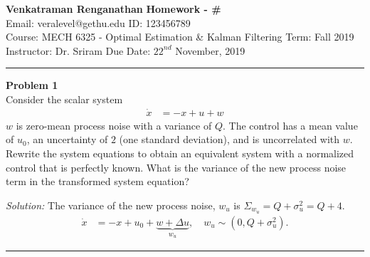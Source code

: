 \documentclass[a4paper, 11pt]{article}
\newenvironment{problem}[2][Problem]
    { \begin{mdframed}[backgroundcolor=gray!20] \textbf{#1 #2} \\}
    {  \end{mdframed}}
\newenvironment{solution}
    {\textit{Solution:}}
    {}
\begin{document}
\noindent
\large\textbf{Venkatraman Renganathan} \hfill \textbf{Homework - \#}   \\
Email: veralevel@gethu.edu \hfill ID: 123456789 \\
\normalsize Course: MECH 6325 - Optimal Estimation \& Kalman Filtering \hfill Term: Fall 2019\\
Instructor: Dr. Sriram \hfill Due Date: $22^{nd}$ November, 2019 \\
\noindent\rule{7in}{2.8pt}
\begin{problem}{1}
Consider the scalar system
\begin{align*}
    \Dot{x} &= -x + u + w
\end{align*}
$w$ is zero-mean process noise with a variance of $Q$. The control has a mean value of $u_0$, an uncertainty of $2$ (one standard deviation), and is uncorrelated with $w$. Rewrite the system equations to obtain an equivalent system with a normalized control that is perfectly known. What is the variance of the new process noise term in the transformed system equation?
\end{problem}
\begin{solution}
The variance of the new process noise, $w_u$ is $\Sigma_{w_{u}} = Q + \sigma^2_u = Q + 4$.
\begin{align*}
    \Dot{x} &= -x + u_0 + \underbrace{w + \Delta u}_{w_{u}}, \quad w_u \sim (0, Q + \sigma^2_u).
\end{align*}
\end{solution} 
\noindent\rule{7in}{2.8pt}

\end{document}
